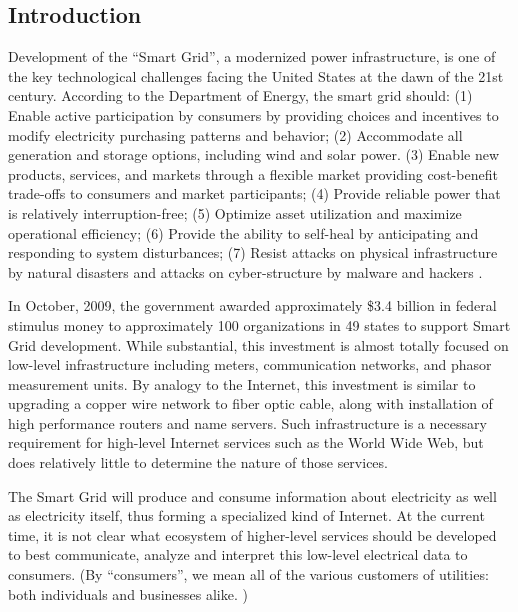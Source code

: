 
\subsection{Introduction}

Development of the ``Smart Grid'', a modernized power infrastructure, is
one of the key technological challenges facing the United States at the
dawn of the 21st century. According to the Department of Energy, the smart
grid should: (1) Enable active participation by consumers by providing
choices and incentives to modify electricity purchasing patterns and
behavior; (2) Accommodate all generation and storage options, including
wind and solar power.  (3) Enable new products, services, and markets
through a flexible market providing cost-benefit trade-offs to consumers and
market participants; (4) Provide reliable power that is relatively
interruption-free; (5) Optimize asset utilization and maximize operational
efficiency; (6) Provide the ability to self-heal by anticipating and
responding to system disturbances; (7) Resist attacks on physical
infrastructure by natural disasters and attacks on cyber-structure by
malware and hackers \cite{NETL:GridCharacteristics}.

In October, 2009, the government awarded approximately \$3.4 billion in
federal stimulus money to approximately 100 organizations in 49 states to
support Smart Grid development.  While substantial, this investment is
almost totally focused on low-level infrastructure including meters,
communication networks, and phasor measurement units.  By analogy to the
Internet, this investment is similar to upgrading a copper wire network to
fiber optic cable, along with installation of high performance routers and
name servers.  Such infrastructure is a necessary requirement for
high-level Internet services such as the World Wide Web, but does
relatively little to determine the nature of those services.

The Smart Grid will produce and consume information about electricity as
well as electricity itself, thus forming a specialized kind of Internet. At
the current time, it is not clear what ecosystem of higher-level services
should be developed to best communicate, analyze and interpret this
low-level electrical data to consumers.  (By ``consumers'', we mean all of
the various customers of utilities: both individuals and businesses
alike. )

